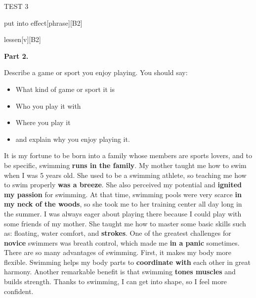 \begin{glossarymc}[Cambridge 6]
\begin{test}{TEST 3}
\begin{VocabExplain}[Part 1]
            \begin{ExplainCard}{put into effect}[phrase][B2]
            \end{ExplainCard}

            \begin{ExplainCard}{lessen}[v][B2]
            \end{ExplainCard}
        \end{VocabExplain}

    \noindent
    \textbf{Part 2.}
    \begin{qa}{Describe a game or sport you enjoy playing. You should say:}

    \begin{itemize}
    \item What kind of game or sport it is
    \item Who you play it with
    \item Where you play it
    \item and explain why you enjoy playing it.
    \end{itemize}

    It is my fortune to be born into a family whose members are sports lovers, and to be specific, swimming \textbf{runs in the family}. My mother taught me how to swim when I was 5 years old. She used to be a swimming athlete, so teaching me how to swim properly \textbf{was a breeze}. She also perceived my potential and \textbf{ignited my passion} for swimming. At that time, swimming pools were very scarce \textbf{in my neck of the woods}, so she took me to her training center all day long in the summer. I was always eager about playing there because I could play with some friends of my mother. She taught me how to master some basic skills such as: floating, water comfort, and \textbf{strokes}. One of the greatest challenges for \textbf{novice} swimmers was breath control, which made me \textbf{in a panic} sometimes. There are so many advantages of swimming. First, it makes my body more flexible. Swimming helps my body parts to \textbf{coordinate with} each other in great harmony. Another remarkable benefit is that swimming \textbf{tones muscles} and builds strength. Thanks to swimming, I can get into shape, so I feel more confident.
    \end{qa}


\end{test}
\end{glossarymc}
